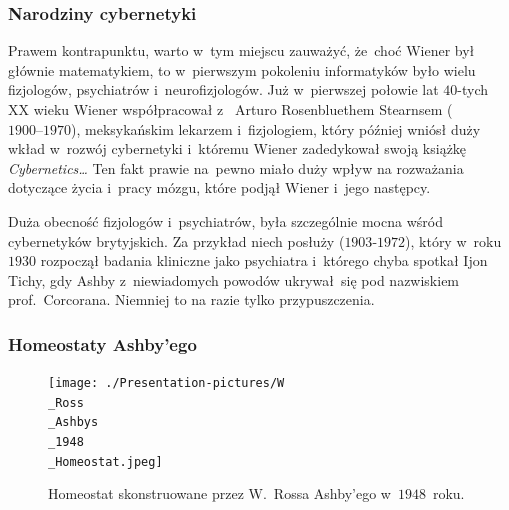 \documentclass[10pt,t]{beamer}
\begin{document}
\begin{frame}
  \frametitle{Narodziny cybernetyki}


  Prawem kontrapunktu, warto w~tym miejscu zauważyć, że~choć Wiener był
  głównie matematykiem, to w~pierwszym pokoleniu informatyków było wielu
  fizjologów, psychiatrów i~neurofizjologów. Już w~pierwszej połowie lat
  $40$-tych XX wieku Wiener współpracował
  z~
  {Arturo Rosenbluethem Stearnsem} ($1900\text{--}1970$), meksykańskim
  lekarzem i~fizjologiem, który później wniósł duży wkład w~rozwój
  cybernetyki i~któremu Wiener zadedykował swoją książkę
  \textit{Cybernetics\ldots} Ten fakt prawie na~pewno miało duży wpływ na
  rozważania dotyczące życia i~pracy mózgu, które podjął Wiener i~jego
  następcy.

  Duża obecność fizjologów i~psychiatrów, była szczególnie mocna wśród
  cybernetyków brytyjskich. Za przykład niech posłuży
   ($1903\text{-}1972$), który w~roku $1930$ rozpoczął badania
  kliniczne jako psychiatra i~którego chyba spotkał Ijon Tichy, gdy Ashby
  z~niewiadomych powodów ukrywał~się pod nazwiskiem
  prof.~Corcorana. Niemniej to na razie tylko przypuszczenia.

\end{frame}





\begin{frame}
  \frametitle{Homeostaty Ashby’ego}


  \begin{figure}

    \centering


    \texttt{[image: ./Presentation-pictures/W\\\_Ross\\\_Ashbys\\\_1948\\\_Homeostat.jpeg]}


    \caption{
      {Homeostat} skonstruowane przez W.~Rossa Ashby’ego w~$1948$~roku.}


    \label{fig:Homeostat-01}

  \end{figure}

\end{frame}
\end{document}
